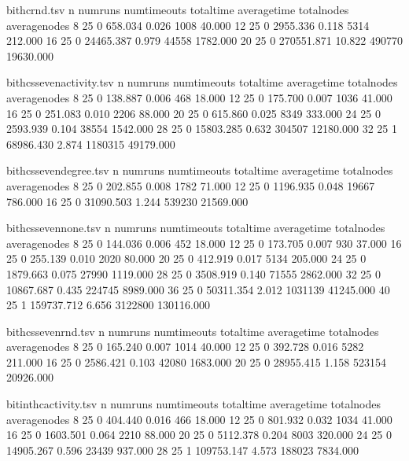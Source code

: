 \begin{filecontents}{bithcrnd.tsv}
	n	numruns	numtimeouts	totaltime	averagetime	totalnodes	averagenodes
	8	25	0	658.034	0.026	1008	40.000
	12	25	0	2955.336	0.118	5314	212.000
	16	25	0	24465.387	0.979	44558	1782.000
	20	25	0	270551.871	10.822	490770	19630.000
\end{filecontents}

\begin{filecontents}{bithcssevenactivity.tsv}
	n	numruns	numtimeouts	totaltime	averagetime	totalnodes	averagenodes
	8	25	0	138.887	0.006	468	18.000
	12	25	0	175.700	0.007	1036	41.000
	16	25	0	251.083	0.010	2206	88.000
	20	25	0	615.860	0.025	8349	333.000
	24	25	0	2593.939	0.104	38554	1542.000
	28	25	0	15803.285	0.632	304507	12180.000
	32	25	1	68986.430	2.874	1180315	49179.000
\end{filecontents}

\begin{filecontents}{bithcssevendegree.tsv}
	n	numruns	numtimeouts	totaltime	averagetime	totalnodes	averagenodes
	8	25	0	202.855	0.008	1782	71.000
	12	25	0	1196.935	0.048	19667	786.000
	16	25	0	31090.503	1.244	539230	21569.000
\end{filecontents}

\begin{filecontents}{bithcssevennone.tsv}
	n	numruns	numtimeouts	totaltime	averagetime	totalnodes	averagenodes
	8	25	0	144.036	0.006	452	18.000
	12	25	0	173.705	0.007	930	37.000
	16	25	0	255.139	0.010	2020	80.000
	20	25	0	412.919	0.017	5134	205.000
	24	25	0	1879.663	0.075	27990	1119.000
	28	25	0	3508.919	0.140	71555	2862.000
	32	25	0	10867.687	0.435	224745	8989.000
	36	25	0	50311.354	2.012	1031139	41245.000
	40	25	1	159737.712	6.656	3122800	130116.000
\end{filecontents}

\begin{filecontents}{bithcssevenrnd.tsv}
	n	numruns	numtimeouts	totaltime	averagetime	totalnodes	averagenodes
	8	25	0	165.240	0.007	1014	40.000
	12	25	0	392.728	0.016	5282	211.000
	16	25	0	2586.421	0.103	42080	1683.000
	20	25	0	28955.415	1.158	523154	20926.000
\end{filecontents}

\begin{filecontents}{bitinthcactivity.tsv}
	n	numruns	numtimeouts	totaltime	averagetime	totalnodes	averagenodes
	8	25	0	404.440	0.016	466	18.000
	12	25	0	801.932	0.032	1034	41.000
	16	25	0	1603.501	0.064	2210	88.000
	20	25	0	5112.378	0.204	8003	320.000
	24	25	0	14905.267	0.596	23439	937.000
	28	25	1	109753.147	4.573	188023	7834.000
\end{filecontents}

